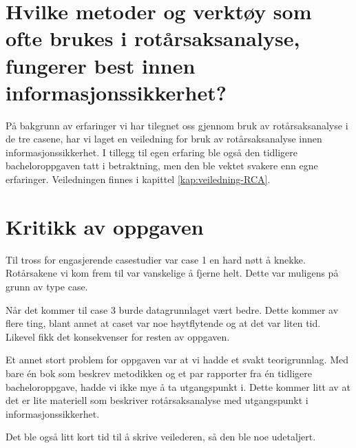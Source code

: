 \section{Hvilke metoder og verktøy som ofte brukes i rotårsaksanalyse, fungerer best innen informasjonssikkerhet?}
På bakgrunn av erfaringer vi har tilegnet oss gjennom bruk av rotårsaksanalyse i de tre casene, har vi laget en veiledning for bruk av rotårsaksanalyse innen informasjonssikkerhet. I tillegg til egen erfaring ble også den tidligere bacheloroppgaven \cite{RCARapport} tatt i betraktning, men den ble vektet svakere enn egne erfaringer. Veiledningen finnes i kapittel \ref{kap:veiledning-RCA}. 


\section{Kritikk av oppgaven}
Til tross for engasjerende casestudier var case 1 en hard nøtt å knekke. Rotårsakene vi kom frem til var vanskelige å fjerne helt. Dette var muligens på grunn av type case. 

Når det kommer til case 3 burde datagrunnlaget vært bedre. Dette kommer av flere ting, blant annet at caset var noe høytflytende og at det var liten tid. Likevel fikk det konsekvenser for resten av oppgaven. 

Et annet stort problem for oppgaven var at vi hadde et svakt teorigrunnlag. Med bare én bok som beskrev metodikken og et par rapporter fra én tidligere bacheloroppgave, hadde vi ikke mye å ta utgangspunkt i. Dette kommer litt av at det er lite materiell som beskriver rotårsaksanalyse med utgangspunkt i informasjonssikkerhet. 

Det ble også litt kort tid til å skrive veilederen, så den ble noe udetaljert. 